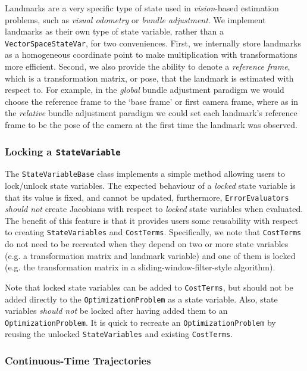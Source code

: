 \documentclass[10pt,letterpaper,fleqn,oneside]{article}
\newcommand{\code}[1]{\texttt{#1}}
\begin{document}
Landmarks are a very specific type of state used in \emph{vision}-based estimation problems, such as \emph{visual odometry} or \emph{bundle adjustment}.
We implement landmarks as their own type of state variable, rather than a \code{VectorSpaceStateVar}, for two conveniences.
First, we internally store landmarks as a homogeneous coordinate point to make multiplication with transformations more efficient.
Second, we also provide the ability to denote a \emph{reference frame}, which is a transformation matrix, or pose, that the landmark is estimated with respect to.
For example, in the \emph{global} bundle adjustment paradigm we would choose the reference frame to the `base frame' or first camera frame, where as in the \emph{relative} bundle adjustment paradigm we could set each landmark's reference frame to be the pose of the camera at the first time the landmark was observed.

\subsubsection{Locking a \code{StateVariable}}
\label{sec:lock}

The \code{StateVariableBase} class implements a simple method allowing users to lock/unlock state variables.
The expected behaviour of a \emph{locked} state variable is that its value is fixed, and cannot be updated, furthermore, \code{ErrorEvaluators} \emph{should not} create Jacobians with respect to \emph{locked} state variables when evaluated.
The benefit of this feature is that it provides users some reusability with respect to creating \code{StateVariables} and \code{CostTerms}.
Specifically, we note that \code{CostTerms} do not need to be recreated when they depend on two or more state variables (e.g. a transformation matrix and landmark variable) and one of them is locked (e.g. the transformation matrix in a sliding-window-filter-style algorithm).

Note that locked state variables can be added to \code{CostTerms}, but should not be added directly to the \code{OptimizationProblem} as a state variable.
Also, state variables \emph{should not} be locked after having added them to an \code{OptimizationProblem}. It is quick to recreate an \code{OptimizationProblem} by reusing the unlocked \code{StateVariables} and existing \code{CostTerms}.


\subsubsection{Continuous-Time Trajectories}
\end{document}
